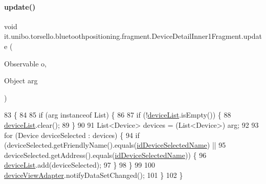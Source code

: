 \paragraph{\texorpdfstring{update()}{update()}}
{\footnotesize\ttfamily void it.\+unibo.\+torsello.\+bluetoothpositioning.\+fragment.\+Device\+Detail\+Inner1\+Fragment.\+update (\begin{DoxyParamCaption}\item[{Observable}]{o,  }\item[{Object}]{arg }\end{DoxyParamCaption})}


\begin{DoxyCode}
83                                                  \{
84 
85         \textcolor{keywordflow}{if} (arg instanceof List) \{
86 
87             \textcolor{keywordflow}{if} (!\hyperlink{classit_1_1unibo_1_1torsello_1_1bluetoothpositioning_1_1fragment_1_1DeviceDetailInner1Fragment_a9e1211f228949b78f453eb9a65d93752_a9e1211f228949b78f453eb9a65d93752}{deviceList}.isEmpty()) \{
88                 \hyperlink{classit_1_1unibo_1_1torsello_1_1bluetoothpositioning_1_1fragment_1_1DeviceDetailInner1Fragment_a9e1211f228949b78f453eb9a65d93752_a9e1211f228949b78f453eb9a65d93752}{deviceList}.clear();
89             \}
90 
91             List<Device> devices = (List<Device>) arg;
92 
93             \textcolor{keywordflow}{for} (Device deviceSelected : devices) \{
94                 \textcolor{keywordflow}{if} (deviceSelected.getFriendlyName().equals(\hyperlink{classit_1_1unibo_1_1torsello_1_1bluetoothpositioning_1_1fragment_1_1DeviceDetailInner1Fragment_a15c5b5dd3b89ff572fb25b5825ef6fdf_a15c5b5dd3b89ff572fb25b5825ef6fdf}{idDeviceSelectedName}) ||
95                         deviceSelected.getAddress().equals(\hyperlink{classit_1_1unibo_1_1torsello_1_1bluetoothpositioning_1_1fragment_1_1DeviceDetailInner1Fragment_a15c5b5dd3b89ff572fb25b5825ef6fdf_a15c5b5dd3b89ff572fb25b5825ef6fdf}{idDeviceSelectedName})) \{
96                     \hyperlink{classit_1_1unibo_1_1torsello_1_1bluetoothpositioning_1_1fragment_1_1DeviceDetailInner1Fragment_a9e1211f228949b78f453eb9a65d93752_a9e1211f228949b78f453eb9a65d93752}{deviceList}.add(deviceSelected);
97                 \}
98             \}
99 
100             \hyperlink{classit_1_1unibo_1_1torsello_1_1bluetoothpositioning_1_1fragment_1_1DeviceDetailInner1Fragment_ac96cc01fc4f531a4cb38a31cf56e81e9_ac96cc01fc4f531a4cb38a31cf56e81e9}{deviceViewAdapter}.notifyDataSetChanged();
101         \}
102     \}
\end{DoxyCode}


